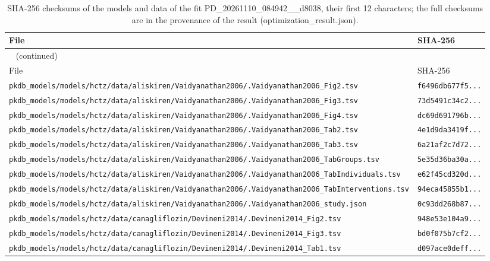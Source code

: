 \documentclass{article}
\begin{document}
\begin{longtable}{ll}
\caption{SHA-256 checksums of the models and data of the fit PD\_20261110\_084942\_\_d8038, their first 12 characters; the full checksums are in the provenance of the result (optimization\_result.json).}\label{tab:checksums:PD_20261110_084942__d8038} \\
\toprule
File & SHA-256 \\
\midrule
\endfirsthead
\multicolumn{2}{l}{\small\tablename~\thetable{} (continued)} \\
\toprule
File & SHA-256 \\
\midrule
\endhead
\bottomrule
\endlastfoot
\texttt{pkdb\_models/models/hctz/data/aliskiren/Vaidyanathan2006/.Vaidyanathan2006\_Fig2.tsv} & \texttt{f6496db677f5...} \\
\texttt{pkdb\_models/models/hctz/data/aliskiren/Vaidyanathan2006/.Vaidyanathan2006\_Fig3.tsv} & \texttt{73d5491c34c2...} \\
\texttt{pkdb\_models/models/hctz/data/aliskiren/Vaidyanathan2006/.Vaidyanathan2006\_Fig4.tsv} & \texttt{dc69d691796b...} \\
\texttt{pkdb\_models/models/hctz/data/aliskiren/Vaidyanathan2006/.Vaidyanathan2006\_Tab2.tsv} & \texttt{4e1d9da3419f...} \\
\texttt{pkdb\_models/models/hctz/data/aliskiren/Vaidyanathan2006/.Vaidyanathan2006\_Tab3.tsv} & \texttt{6a21af2c7d72...} \\
\texttt{pkdb\_models/models/hctz/data/aliskiren/Vaidyanathan2006/.Vaidyanathan2006\_TabGroups.tsv} & \texttt{5e35d36ba30a...} \\
\texttt{pkdb\_models/models/hctz/data/aliskiren/Vaidyanathan2006/.Vaidyanathan2006\_TabIndividuals.tsv} & \texttt{e62f45cd320d...} \\
\texttt{pkdb\_models/models/hctz/data/aliskiren/Vaidyanathan2006/.Vaidyanathan2006\_TabInterventions.tsv} & \texttt{94eca45855b1...} \\
\texttt{pkdb\_models/models/hctz/data/aliskiren/Vaidyanathan2006/.Vaidyanathan2006\_study.json} & \texttt{0c93dd268b87...} \\
\texttt{pkdb\_models/models/hctz/data/canagliflozin/Devineni2014/.Devineni2014\_Fig2.tsv} & \texttt{948e53e104a9...} \\
\texttt{pkdb\_models/models/hctz/data/canagliflozin/Devineni2014/.Devineni2014\_Fig3.tsv} & \texttt{bd0f075b7cf2...} \\
\texttt{pkdb\_models/models/hctz/data/canagliflozin/Devineni2014/.Devineni2014\_Tab1.tsv} & \texttt{d097ace0deff...} \\

\end{longtable}
\end{document}
